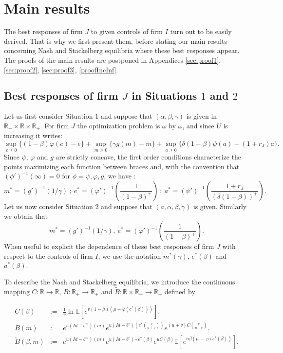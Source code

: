 \documentclass{svjour3}
\begin{document}
\section{Main results}\label{sec:result}
The best responses of firm $J$ to given controls of firm $I$ turn out to be easily derived. That is why we first present them, before stating our main results concerning Nash and Stackelberg equilibria where these best responses appear. The proofs of the main results are postponed in Appendices \ref{sec:proof1}, \ref{sec:proof2}, \ref{sec:proof3}, \ref{proofIncInf}.

\subsection{Best responses of firm $J$ in Situations $1$ and $2$}\label{bestrespj}
Let us first consider Situation $1$ and suppose that $(\alpha,\beta,\gamma)$ is given in $\mathbb{R}_+\times\mathbb{R}\times \mathbb{R}_+$. For firm $J$ the optimization problem is $\omega$ by $\omega$, and since $U$ is increasing it writes:
$$
\sup_{e\geq 0}\{(1-\beta) \varphi(e)-e\}+\sup_{m\geq 0}\{\gamma g(m)-m\}+\sup_{a \geq 0}\{\delta (1-\beta) \psi(a) -(1+r_J)a \} .
$$
Since $\psi$, $\varphi$ and $g$ are strictly concave, the first order conditions characterize the points maximizing each function between braces and, with the convention that $(\phi')^{-1}(\infty)=0$ for $\phi=\psi,\varphi,g$, we have :
\begin{equation}
m^*=(g')^{-1}(1/\gamma)~;~
\label{opt2}
e^*=(\varphi')^{-1}\left(\frac{1}{(1-\beta)^+}\right)~;~
a^*=(\psi')^{-1}\left(\frac{1+r_J}{(\delta(1-\beta))^+}\right).
\end{equation}
Let us now consider Situation $2$ and suppose that $(a,\alpha,\beta,\gamma)$ is given. Similarly we obtain that
\begin{equation}
\label{e*m*}
m^*=(g')^{-1}(1/\gamma),~
e^*=(\varphi')^{-1}\left(\frac{1}{(1-\beta)^+}\right).
\end{equation}
When useful to explicit the dependence of these best responses of firm $J$ with respect to the controls of firm $I$, we use the notation $m^*(\gamma)$, $e^*(\beta)$ and $a^*(\beta)$.

To describe the Nash and Stackelberg equilibria, we introduce the continuous mapping $C:\mathbb{R}\to\mathbb{R}$, $B:\mathbb{R}_+\to\mathbb{R}_+$ and $\tilde B:\mathbb{R}\times\mathbb{R}_+\to\mathbb{R}_+$ defined by 

\begin{eqnarray}
 \label{defA} C(\beta)&:=&\frac{1}{v}\ln\mathbb{E}\left[e^{v(1-\beta)(\mu-\varphi( e^*(\beta)))}\right],\\
B(m)&:=&e^{u(Id-b^m)( m)}e^{u(Id-b^e)(e^*(\frac{v}{u+v}))}e^{(u+v) C(\frac{v}{u+v})},\label{defBnash}\\
\label{defB}\tilde B(\beta,m)&:=&e^{u(Id-b^m)(m)}e^{u(Id-b^e)\circ e^*(\beta)}e^{uC(\beta)}\mathbb{E}\left[e^{u\beta(\mu~-\varphi\circ e^*(\beta))}\right].
\end{eqnarray}
\end{document}
